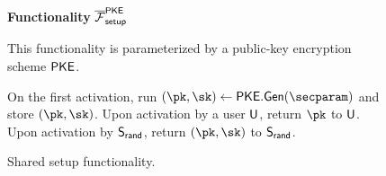 \begin{figure}[h]
	\begin{center}
		\begin{techbox}
			\centerline{\textbf{Functionality} $\overline{\mathcal{F}}_{\mathsf{setup}}^{\mathsf{PKE}}$}

			This functionality is parameterized by a public-key encryption scheme $\mathsf{PKE}$.

			\boxsep

			On the first activation, run $(\pk, \sk) \gets \encscheme.\Gen(\secparam)$ and store $(\pk, \sk)$.
			Upon activation by a user $\mathsf{U}$, return $\pk$ to $\mathsf{U}$.
			Upon activation by $\mathsf{S}_{\mathsf{rand}}$, return $(\pk, \sk)$ to $\mathsf{S}_{\mathsf{rand}}$.
		\end{techbox}
	\end{center}
	\caption{Shared setup functionality.}
	\label{fig:func:setup}
\end{figure}
